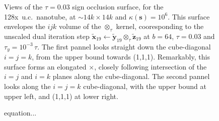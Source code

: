 \documentclass[letterpaper,twocolumn,amsmath,amsfont,amssymb,english,aps,jcp,preprintnumbers,groupaddress,nofootinbib,tightenlines]{revtex4}
\newcommand{\mat}[1]{\boldsymbol{#1}}
\newcommand{\mmat}[1]{\widetilde{\boldsymbol{#1}}}
\newcommand{\ot}{ {\scriptstyle \otimes}_{ \tau } }
\begin{document}
 \begin{figure}[h] \label{markofzorro}
 \caption{Views of the $\tau =0.03$ sign occlusion surface, for the 
 128x~u.c.~nanotube, at $\sim {14k \times 14k}$ and $\kappa(\mat{s})=10^6$. 
 This surface envelopes the $ijk$ volume of the $\ot$ kernel,  
 cooresponding to the unscaled dual iteration step $\mmat{x}_{19} \leftarrow \mmat{y}_{19} \ot \mmat{z}_{19} $ at $b=64$, $\tau=0.03$ and
 $\tau_y=10^{-3} \, \tau $.  The first pannel looks straight down the cube-diagonal $i=j=k$, from the upper bound towards (1,1,1).
 Remarkably, this surface forms an elongated $\times$, closely following intersection of the $i=j$  and $i=k$ planes 
 along the cube-diagonal. The second pannel looks along the $i=j=k$ cube-diagonal, with the upper bound at upper left, and (1,1,1) at lower right.}
 \end{figure}





\begin{figure}[h]
  \caption{equation...}
\end{figure}
\end{document}
